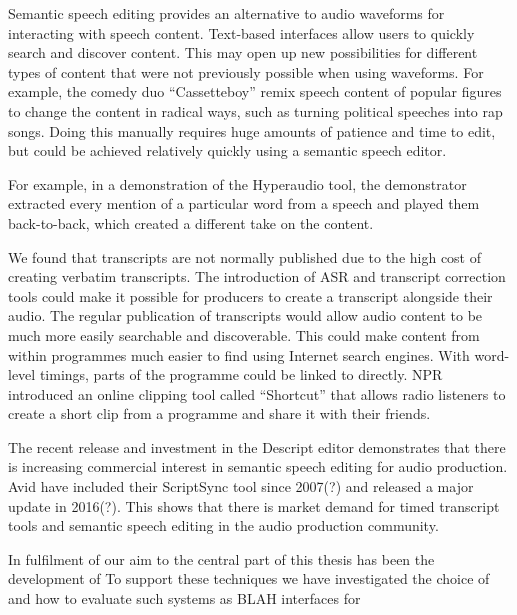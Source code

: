 Semantic speech editing provides an alternative to audio waveforms for interacting with speech content. Text-based
interfaces allow users to quickly search and discover content. This may open up new possibilities for different types
of content that were not previously possible when using waveforms. For example, the comedy duo ``Cassetteboy'' remix
speech content of popular figures to change the content in radical ways, such as turning political speeches into rap
songs. Doing this manually requires huge amounts of patience and time to edit, but could be achieved relatively quickly
using a semantic speech editor.

For example, in a demonstration of the Hyperaudio tool, the demonstrator extracted every mention of a particular word
from a speech and played them back-to-back, which created a different take on the content.

We found that transcripts are not normally published due to the high cost of creating verbatim transcripts. The
introduction of ASR and transcript correction tools could make it possible for producers to create a transcript
alongside their audio. The regular publication of transcripts would allow audio content to be much more easily
searchable and discoverable. This could make content from within programmes much easier to find using Internet search
engines. With word-level timings, parts of the programme could be linked to directly. NPR introduced an online clipping
tool called ``Shortcut'' \citep{Friedhoff2016} that allows radio listeners to create a short clip from a programme and
share it with their friends. 

The recent release and investment in the Descript editor demonstrates that there is increasing commercial interest in
semantic speech editing for audio production. Avid have included their ScriptSync tool since 2007(?) and released a
major update in 2016(?). This shows that there is market demand for timed transcript tools and semantic speech editing
in the audio production community.





In fulfilment of our aim to
the central part of this thesis has been the development of
To support these techniques we have investigated the choice of
and how to evaluate such systems as BLAH interfaces for 

